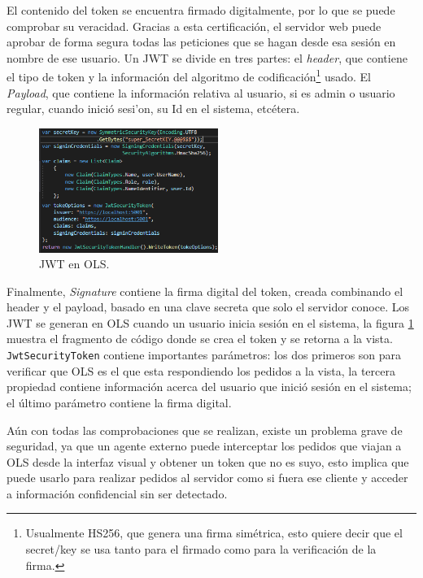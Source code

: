 El contenido del token se encuentra firmado digitalmente, por lo que se puede comprobar su veracidad. Gracias a esta certificaci\'on, el servidor web puede aprobar de forma segura todas las peticiones que se hagan desde esa sesi\'on en nombre de ese usuario. Un JWT se divide en tres partes: el \textit{header}, que contiene el tipo de token y la informaci\'on del algoritmo de codificaci\'on\footnote{Usualmente HS256, que genera una firma sim\'etrica, esto quiere decir que el secret/key se usa tanto para el firmado como para la verificaci\'on de la firma.} usado. El \textit{Payload}, que contiene la informaci\'on relativa al usuario, si es admin o usuario regular, cuando inici\'o sesi'on, su Id en el sistema, etc\'etera.

\begin{figure}
\vspace{-20pt}
\begin{center}
\includegraphics[width=0.52\textwidth]{images/jwtOLS.png} 
\end{center} \vspace{-20pt} \caption{JWT en OLS.}  \label{jwtOLS} \vspace{-10pt} 
\end{figure}

Finalmente, \textit{Signature} contiene la firma digital del token, creada combinando el header y el payload, basado en una clave secreta que solo el servidor conoce. Los JWT se generan en OLS cuando un usuario inicia sesi\'on en el sistema, la figura \ref{jwtOLS} muestra el fragmento de c\'odigo donde se crea el token y se retorna a la vista. \texttt{JwtSecurityToken} contiene importantes par\'ametros: los dos primeros son para verificar que OLS es el que esta respondiendo los pedidos a la vista, la tercera propiedad contiene informaci\'on acerca del usuario que inici\'o sesi\'on en el sistema; el \'ultimo par\'ametro contiene la firma digital.

A\'un con todas las comprobaciones que se realizan, existe un problema grave de seguridad, ya que un agente externo puede interceptar los pedidos que viajan a OLS desde la interfaz visual y obtener un token que no es suyo, esto implica que puede usarlo para realizar pedidos al servidor como si fuera ese cliente y acceder a informaci\'on confidencial sin ser detectado. 

